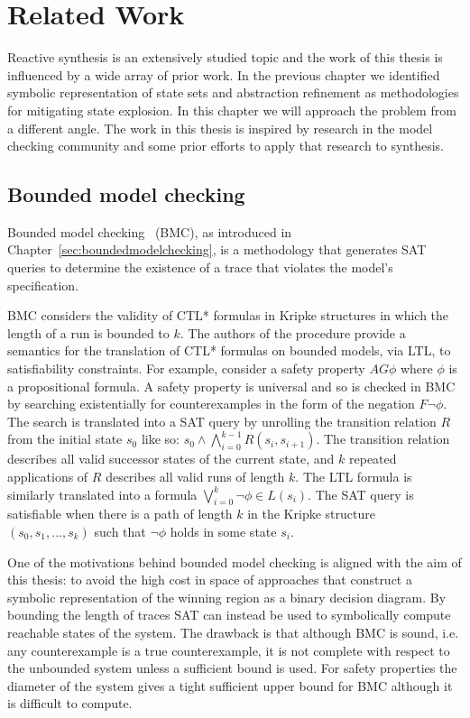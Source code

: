 \chapter{Related Work}
\label{ch:relatedwork}

Reactive synthesis is an extensively studied topic and the work of this thesis is influenced by a wide array of prior work. In the previous chapter we identified symbolic representation of state sets and abstraction refinement as methodologies for mitigating state explosion. In this chapter we will approach the problem from a different angle. The work in this thesis is inspired by research in the model checking community and some prior efforts to apply that research to synthesis.

\section{Bounded model checking}

Bounded model checking~\cite{Biere99} (BMC), as introduced in Chapter~\ref{sec:boundedmodelchecking}, is a methodology that generates SAT queries to determine the existence of a trace that violates the model's specification. 

BMC considers the validity of CTL* formulas in Kripke structures in which the length of a run is bounded to $k$. The authors of the procedure provide a semantics for the translation of CTL* formulas on bounded models, via LTL, to satisfiability constraints. For example, consider a safety property $AG \phi$ where $\phi$ is a propositional formula. A safety property is universal and so is checked in BMC by searching existentially for counterexamples in the form of the negation $F \lnot \phi$. The search is translated into a SAT query by unrolling the transition relation $R$ from the initial state $s_0$ like so: $s_0 \land \bigwedge_{i=0}^{k-1} R(s_i, s_{i+1})$. The transition relation describes all valid successor states of the current state, and $k$ repeated applications of $R$ describes all valid runs of length $k$.  The LTL formula is similarly translated into a formula $\bigvee_{i=0}^{k} \lnot \phi \in L(s_i)$. The SAT query is satisfiable when there is a path of length $k$ in the Kripke structure $(s_0, s_1, ..., s_k)$ such that $\lnot \phi$ holds in some state $s_i$.

One of the motivations behind bounded model checking is aligned with the aim of this thesis: to avoid the high cost in space of approaches that construct a symbolic representation of the winning region as a binary decision diagram. By bounding the length of traces SAT can instead be used to symbolically compute reachable states of the system. The drawback is that although BMC is sound, i.e. any counterexample is a true counterexample, it is not complete with respect to the unbounded system unless a sufficient bound is used. For safety properties the diameter of the system gives a tight sufficient upper bound for BMC although it is difficult to compute.

